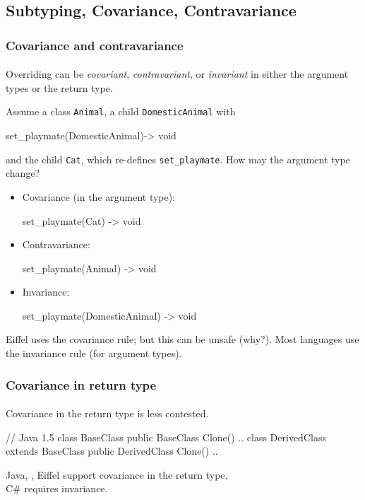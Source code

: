 \documentclass{beamer}
\begin{document}
\subsection{Subtyping, Covariance, Contravariance}
\begin{frame}[fragile]
\frametitle{Covariance and contravariance}
\framesubtitle{}
Overriding can be \textit{covariant}, 
\textit{contravariant}, or \textit{invariant} in either
the argument types or the return type.
\bigskip


Assume a class \texttt{Animal}, a child \texttt{DomesticAnimal} with 
\begin{cplus3}
       set_playmate(DomesticAnimal)->  void 
\end{cplus3}

and the child \texttt{Cat},
which re-defines \texttt{set_playmate}. 
How may the argument type change?%
\begin{itemize}
\item Covariance (in the argument type):
\begin{cplus3}
 set_playmate(Cat) -> void
\end{cplus3}
 \item Contravariance:
\begin{cplus3}
 set_playmate(Animal) -> void
\end{cplus3}
  \item Invariance: 
\begin{cplus3}
 set_playmate(DomesticAnimal) -> void
\end{cplus3}


\end{itemize}
Eiffel uses the covariance rule; but this can be unsafe (why?).
Most languages use the invariance rule (for argument types). 
\end{frame}

\begin{frame}[fragile]
\frametitle{Covariance in return type}
\framesubtitle{}
Covariance in the return type is less contested.
\bigskip

\begin{cplus3}
// Java 1.5
class BaseClass {
    public BaseClass Clone() {..}
}
class DerivedClass extends BaseClass {
    public DerivedClass Clone() {..}
}
\end{cplus3}
Java, \Cpp, Eiffel support covariance in the return type.\\
C\# requires invariance. 
\end{frame}
\end{document}
